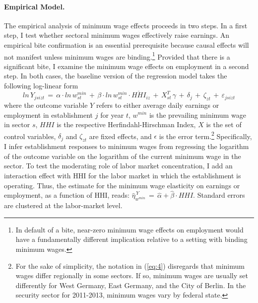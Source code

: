 \documentclass[11pt,oneside,reqno,xcolor=dvipsnames]{article} %
\begin{document}
\paragraph{Empirical Model.} The empirical analysis of minimum wage effects proceeds in two steps. In a first step, I test whether sectoral minimum wages effectively raise earnings. An empirical bite confirmation is an essential prerequisite because causal effects will not manifest unless minimum wages are binding.\footnote{In default of a bite, near-zero minimum wage effects on employment would have a fundamentally different implication relative to a setting with binding minimum wages.} Provided that there is a significant bite, I examine the minimum wage effects on employment in a second step. In both cases, the baseline version of the regression model takes the following log-linear form
\begin{equation}
\label{eq:4}
ln\,Y_{jsizt} \,=\,  \alpha \cdot ln\,w^{min}_{st}\, + \, \beta \cdot ln\,w^{min}_{st} \cdot \overline{H\!H\!I}_{iz}  \, + \,  X^{T}_{st} \,  \gamma \,+\, \delta_{j}  \,+\, \zeta_{zt}  \,+\, \varepsilon_{jsizt}
\end{equation}
where the outcome variable $Y$ refers to either average daily earnings or employment in establishment $j$ for year $t$, $w^{min}$ is the prevailing minimum wage in sector $s$, $H\!H\!I$ is the respective Herfindahl-Hirschman Index, $X$ is the set of control variables, $\delta_{j}$ and $\zeta_{zt}$ are fixed effects, and $\epsilon$ is the error term.\footnote{For the sake of simplicity, the notation in (\ref{eq:4}) disregards that minimum wages differ regionally in some sectors. If so, minimum wages are usually set differently for West Germany, East Germany, and the City of Berlin. In the security sector for 2011-2013, minimum wages vary by federal state.} Specifically, I infer establishment responses to minimum wages from regressing the logarithm of the outcome variable on the logarithm of the current minimum wage in the sector. To test the moderating role of labor market concentration, I add an interaction effect with HHI for the labor market in which the establishment is operating. Thus, the estimate for the minimum wage elasticity on earnings or employment, as a function of HHI, reads: $\hat{\eta}^{\,Y}_{w^{min}} \,=\, \hat{\alpha} + \hat{\beta} \cdot H\!H\!I $. Standard errors are clustered at the labor-market level.
\end{document}
